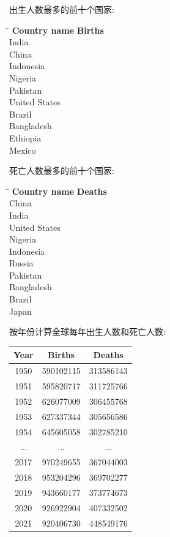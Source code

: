 \documentclass{ctexart}
\begin{document}
    出生人数最多的前十个国家: \par
    \begin{tabbing}
    \hspace{2cm} \= \kill
    \textbf{Country name} \> \textbf{Births} \\
    India  \\
    China  \\
    Indonesia  \\
    Nigeria  \\
    Pakistan  \\
    United States  \\
    Brazil  \\
    Bangladesh  \\
    Ethiopia  \\
    Mexico  \\
    \end{tabbing}
    
    死亡人数最多的前十个国家: \par
    \begin{tabbing}
    \hspace{2cm} \= \kill
    \textbf{Country name} \> \textbf{Deaths} \\
    China  \\
    India  \\
    United States  \\
    Nigeria  \\
    Indonesia  \\
    Russia  \\
    Pakistan  \\
    Bangladesh  \\
    Brazil  \\
    Japan  \\
    \end{tabbing}
    
    按年份计算全球每年出生人数和死亡人数: \par
    \begin{longtable}{|c|c|c|}
    \hline
    Year & Births & Deaths \\
    \hline
    1950 & 590102115 & 313586143 \\
    1951 & 595820717 & 311725766 \\
    1952 & 626077009 & 306455768 \\
    1953 & 627337344 & 305656586 \\
    1954 & 645605058 & 302785210 \\
    ... & ... & ... \\
    2017 & 970249655 & 367044003 \\
    2018 & 953204296 & 369702277 \\
    2019 & 943660177 & 373774673 \\
    2020 & 926922904 & 407332502 \\
    2021 & 920406730 & 448549176 \\
    \hline
    \end{longtable}
    
\end{document}
